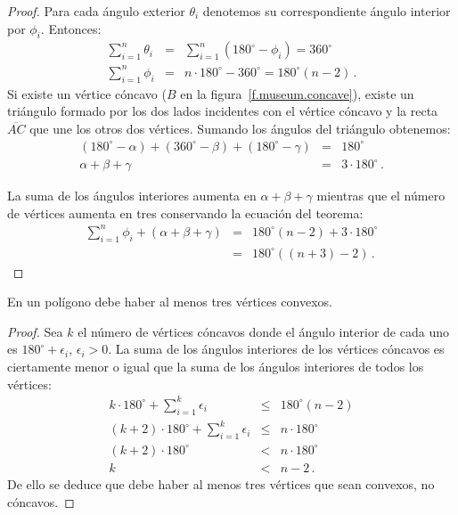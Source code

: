 \begin{proof}
Para cada ángulo exterior $\theta_i$ denotemos su correspondiente ángulo interior por $\phi_i$. Entonces:
\begin{eqnarray*}
\displaystyle\sum_{i=1}^n \theta_i &=&\displaystyle\sum_{i=1}^n (180^\circ-\phi_i)= 360^\circ\\
\displaystyle\sum_{i=1}^n \phi_i &=& n\cdot 180^\circ-360^\circ =180^\circ(n-2)\,.
\end{eqnarray*}
Si existe un vértice cóncavo ($B$ en la figura~\ref{f.museum.concave}), existe un triángulo formado por los dos lados incidentes con el vértice cóncavo y la recta $\overline{AC}$ que une los otros dos vértices. Sumando los ángulos del triángulo obtenemos:
\begin{eqnarray*}
(180^\circ - \alpha) + (360^\circ - \beta) + (180^\circ - \gamma) &=& 180^\circ\\
\alpha + \beta + \gamma &=& 3\cdot 180^\circ\,.
\end{eqnarray*}

La suma de los ángulos interiores aumenta en $\alpha+\beta+\gamma$ mientras que el número de vértices aumenta en tres conservando la ecuación del teorema:
\begin{eqnarray*}
\displaystyle\sum_{i=1}^n \phi_i + (\alpha + \beta + \gamma) &=& 180^\circ(n-2)+3\cdot 180^\circ\\
&=& 180^\circ((n+3)-2)\,.
\end{eqnarray*}
\end{proof}

\begin{theorem}\label{thm.convex}
En un polígono debe haber al menos tres vértices convexos.
\end{theorem}

\begin{proof}
Sea $k$ el número de vértices cóncavos donde el ángulo interior de cada uno es $180^\circ+\epsilon_i$, $\epsilon_i>0$. La suma de los ángulos interiores de los vértices cóncavos es ciertamente menor o igual que la suma de los ángulos interiores de todos los vértices:
\begin{eqnarray*}
k\cdot 180^\circ +\displaystyle\sum_{i=1}^{k}\epsilon_i &\leq& 180^\circ(n-2)\\
(k+2)\cdot 180^\circ +\displaystyle\sum_{i=1}^{k}\epsilon_i &\leq& n\cdot 180^\circ\\
(k+2)\cdot 180^\circ &<& n\cdot 180^\circ\\
k&<&n-2\,.
\end{eqnarray*}
De ello se deduce que debe haber al menos tres vértices que sean convexos, no cóncavos.
\end{proof}

